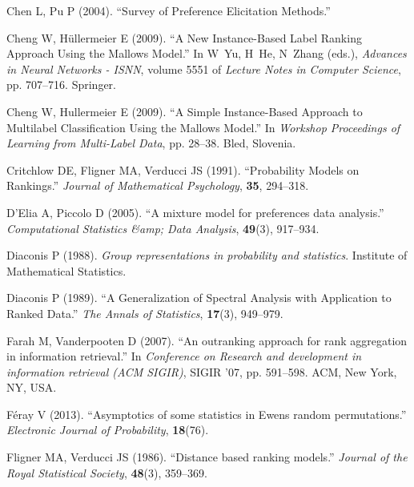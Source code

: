 \documentclass[article,nojss]{jss}
\begin{document}
\begin{thebibliography}{36}
Chen L, Pu P (2004).
\newblock \enquote{{Survey of Preference Elicitation Methods}.}

Cheng W, H\"{u}llermeier E (2009).
\newblock \enquote{{A New Instance-Based Label Ranking Approach Using the
  Mallows Model}.}
\newblock In W~Yu, H~He, N~Zhang (eds.), \emph{Advances in Neural Networks -
  ISNN}, volume 5551 of \emph{Lecture Notes in Computer Science}, pp. 707--716.
  Springer.

Cheng W, Hullermeier E (2009).
\newblock \enquote{{A Simple Instance-Based Approach to Multilabel
  Classification Using the Mallows Model}.}
\newblock In \emph{Workshop Proceedings of Learning from Multi-Label Data}, pp.
  28--38. Bled, Slovenia.

Critchlow DE, Fligner MA, Verducci JS (1991).
\newblock \enquote{{Probability Models on Rankings}.}
\newblock \emph{Journal of Mathematical Psychology}, \textbf{35}, 294--318.

D'Elia A, Piccolo D (2005).
\newblock \enquote{{A mixture model for preferences data analysis}.}
\newblock \emph{Computational Statistics \&amp; Data Analysis}, \textbf{49}(3),
  917--934.

Diaconis P (1988).
\newblock \emph{{Group representations in probability and statistics}}.
\newblock Institute of Mathematical Statistics.

Diaconis P (1989).
\newblock \enquote{{A Generalization of Spectral Analysis with Application to
  Ranked Data}.}
\newblock \emph{The Annals of Statistics}, \textbf{17}(3), 949--979.

Farah M, Vanderpooten D (2007).
\newblock \enquote{{An outranking approach for rank aggregation in information
  retrieval}.}
\newblock In \emph{Conference on Research and development in information
  retrieval (ACM SIGIR)}, SIGIR '07, pp. 591--598. ACM, New York, NY, USA.

F\'{e}ray V (2013).
\newblock \enquote{{Asymptotics of some statistics in Ewens random
  permutations}.}
\newblock \emph{Electronic Journal of Probability}, \textbf{18}(76).

Fligner MA, Verducci JS (1986).
\newblock \enquote{{Distance based ranking models}.}
\newblock \emph{Journal of the Royal Statistical Society}, \textbf{48}(3),
  359--369.


\end{thebibliography}
\end{document}
